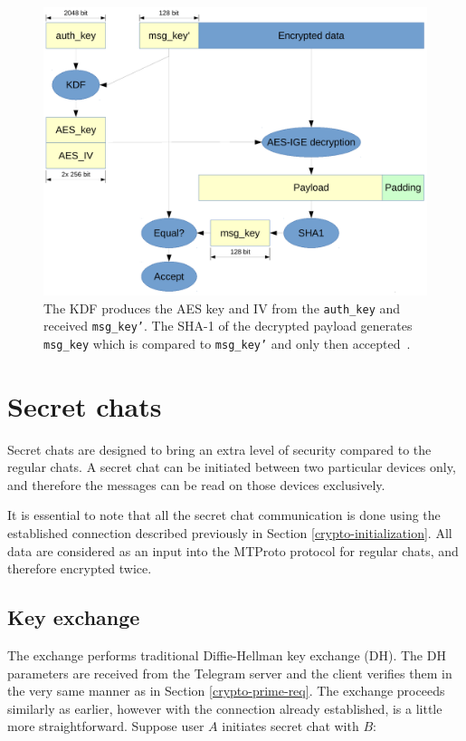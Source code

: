 \documentclass[thesis=M,english]{FITthesis}[2012/10/20]
\begin{document}
\begin{figure}[htb]
	\centering
	\includegraphics[width=1\textwidth]{mtproto-decflow.pdf}
	\caption[MTProto decryption flow]{The KDF produces the AES key and IV from the \texttt{auth\_key} and received \texttt{msg\_key'}. The SHA-1 of the decrypted payload generates \texttt{msg\_key} which is compared to \texttt{msg\_key'} and only then accepted~\cite{telegram-aarhus}.}
	\label{img:telegram-decflow}
\end{figure}




\section{Secret chats}\label{crypto-secret}

Secret chats are designed to bring an extra level of security compared to the regular chats. A secret chat can be initiated between two particular devices only, and therefore the messages can be read on those devices exclusively.

It is essential to note that all the secret chat communication is done using the established connection described previously in Section \ref{crypto-initialization}. All data are considered as an input into the MTProto protocol for regular chats, and therefore encrypted twice.

\subsection{Key exchange}\label{crypto-keyexchange}

The exchange performs traditional Diffie-Hellman key exchange (DH). The DH parameters are received from the Telegram server and the client verifies them in the very same manner as in Section \ref{crypto-prime-req}. The exchange proceeds similarly as earlier, however with the connection already established, is a little more straightforward. Suppose user $A$ initiates secret chat with $B$:
\end{document}
